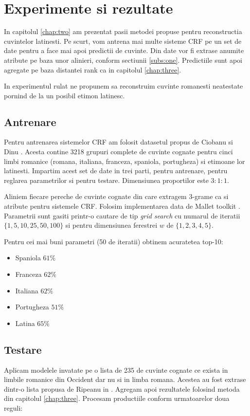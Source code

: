 \chapter{Experimente si rezultate}
In capitolul \ref{chap:two} am prezentat pasii metodei propuse pentru reconstructia cuvintelor
latinesti. Pe scurt, vom antrena mai multe sisteme CRF pe un set de date pentru a face mai apoi 
predictii de cuvinte. Din date vor fi extrase anumite atribute pe baza unor alinieri, conform 
sectiunii \ref{subs:one}. Predictiile sunt apoi agregate pe baza distantei rank ca in capitolul
\ref{chap:three}.

In experimentul rulat ne propunem sa reconstruim cuvinte romanesti neatestate pornind de la un posibil
etimon latinesc.  

\section{Antrenare}
Pentru antrenarea sistemelor CRF am folosit datasetul propus de Ciobanu si Dinu \cite{dataset}.
Acesta contine 3218 grupuri complete de cuvinte cognate pentru cinci limbi romanice (romana, italiana, 
franceza, spaniola, portugheza) si etimoane lor latinesti. Impartim acest set de date in trei parti,
pentru antrenare, pentru reglarea parametrilor si pentru testare. Dimensiunea proportilor este $3:1:1$.

Aliniem fiecare pereche de cuvinte cognate din care extragem 3-grame ca si atribute pentru sistemele CRF.
Folosim implementarea data de Mallet toolkit \cite{mallet}. Parametrii sunt gasiti printr-o cautare
de tip \textit{grid search} cu numarul de iteratii $\{1, 5, 10, 25, 50, 100\}$ si pentru dimensiunea
ferestrei $w$ de $\{1, 2, 3, 4, 5\}$.

Pentru cei mai buni parametri (50 de iteratii) obtinem acuratetea top-10:
\begin{itemize}
    \item Spaniola   $61\%$
    \item Franceza   $62\%$
    \item Italiana   $62\%$
    \item Portugheza $51\%$
    \item Latina     $65\%$
\end{itemize}

\section{Testare}
Aplicam modelele invatate pe o lista de 235 de cuvinte cognate ce exista in limbile romanice din 
Occident dar nu si in limba romana. Acestea au fost extrase dintr-o lista propusa de Ripeanu in \cite{ripeanubook}.
Agregam apoi rezultatele folosind metoda din capitolul \ref{chap:three}. Procesam productiile conform 
urmatoarelor doua reguli:

